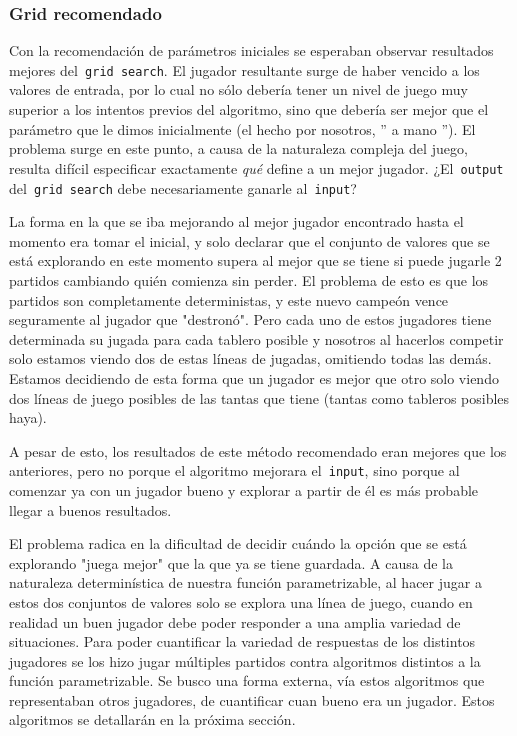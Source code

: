 \documentclass[A4paper,oneside,fleqn,11pt]{article}
\theoremstyle{definition}
\begin{document}
\subsubsection{Grid recomendado}


Con la recomendación de parámetros iniciales se esperaban observar resultados mejores del\texttt{ grid search}. El jugador resultante surge de haber vencido a los valores de entrada, por lo cual no sólo debería tener un nivel de juego muy superior a los intentos previos del algoritmo, sino que debería ser mejor que el parámetro que le dimos inicialmente (el hecho por nosotros, '' a mano ''). El problema surge en este punto, a causa de la naturaleza compleja del juego, resulta difícil especificar exactamente \textit{qué} define a un mejor jugador. ¿El\texttt{ output} del\texttt{ grid search} debe necesariamente ganarle al\texttt{ input}? 

La forma en la que se iba mejorando al mejor jugador encontrado hasta el momento era tomar el inicial, y solo declarar que el conjunto de valores que se está explorando en este momento supera al mejor que se tiene si puede jugarle 2 partidos cambiando quién comienza sin perder. El problema de esto es que los partidos son completamente deterministas, y este nuevo campeón vence seguramente al jugador que "destronó". Pero cada uno de estos jugadores tiene determinada su jugada para cada tablero posible y nosotros al hacerlos competir solo estamos viendo dos de estas líneas de jugadas, omitiendo todas las demás. Estamos decidiendo de esta forma que un jugador es mejor que otro solo viendo dos líneas de juego posibles de las tantas que tiene (tantas como tableros posibles haya).

A pesar de esto, los resultados de este método recomendado eran mejores que los anteriores, pero no porque el algoritmo mejorara el\texttt{ input}, sino porque al comenzar ya con un jugador bueno y explorar a partir de él es más probable llegar a buenos resultados. 

El problema radica en la dificultad de decidir cuándo la opción que se está explorando "juega mejor" que la que ya se tiene guardada. A causa de la naturaleza determinística de nuestra función parametrizable, al hacer jugar a estos dos conjuntos de valores solo se explora una línea de juego, cuando en realidad un buen jugador debe poder responder a una amplia variedad de situaciones. Para poder cuantificar la variedad de respuestas de los distintos jugadores se los hizo jugar múltiples partidos contra algoritmos distintos a la función parametrizable. Se busco una forma externa, vía estos algoritmos que representaban otros jugadores, de cuantificar cuan bueno era un jugador. Estos algoritmos se detallarán en la próxima sección.
\end{document}
